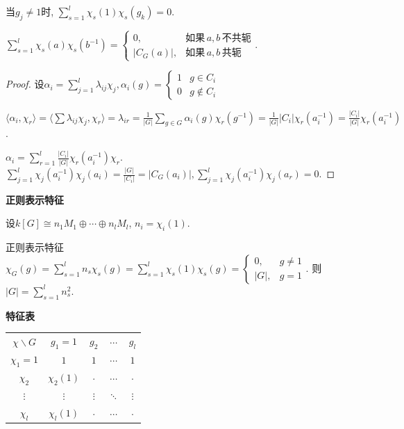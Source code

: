 \begin{corollary}
    当$g_j\neq 1$时, $\sum\limits_{s=1}^l \chi_s(1)\chi_s (g_k)=0$.\par
    \qquad $\sum\limits_{s=1}^l \chi_s(a)\chi_s(b^{-1})
    =\begin{cases} 0, &如果\,a,b\,不共轭\\ |C_G(a)|, &如果\,a, b\,共轭\end{cases}$.
\end{corollary}
\begin{proof}
	设$\alpha_i=\sum_{j=1}^{l} \lambda_{ij}\chi_j,\alpha_i(g)=\begin{cases} 1 &g\in C_i \\ 0 &g\notin C_i\end{cases}$
	
	$\langle  \alpha_i,\chi_r\rangle=\langle  \sum \lambda_{ij}\chi_j,\chi_r\rangle=\lambda _{ir}=\frac{1}{|G|}\sum_{g\in G}\alpha_i(g)\chi_r(g^{-1})=\frac{1}{|G|}|C_i|\chi_r(a_i^{-1})=\frac{|C_i|}{|G|}\chi_r(a_i^{-1})$.
	
	$\alpha_i=\sum_{r=1}^{l} \frac{|C_i|}{|G|}\chi_r(a_i^{-1})\chi_r.$
	$\sum_{j=1}^{l}\chi_j(a_i^{-1})\chi_j(a_i)=\frac{|G|}{|C_i|}=|C_G(a_i)|,\sum_{j=1}^{l}\chi_j(a_i^{-1})\chi_j(a_r)=0$.
\end{proof}
\begin{definition} \textbf{正则表示特征}\par
    \qquad 设$k[G]\cong n_1M_1\oplus \cdots \oplus n_lM_l$, $n_i=\chi_i(1)$.\par
    \qquad 正则表示特征$\chi_G(g)=\sum\limits_{s=1}^l n_s\chi_s(g)
    =\sum\limits_{s=1}^l \chi_s(1)\chi_s(g)
    =\begin{cases} 0, &g\neq 1\\ |G|, &g=1 \end{cases}$. 
    则$|G|=\sum\limits_{s=1}^l n_s^2$.

\end{definition}

\begin{definition}\textbf{特征表}
\begin{center}
\begin{tabular}{c|c|c|c|c} 
    $\chi \backslash G$ & $g_1=1$ & $g_2$ & $\cdots$ & $g_l$ \\
    $\chi_1=1$ & $1$ & $1$ & $\cdots$ & $1$\\
    $\chi_2$ & $\chi_2(1)$ & $\cdot$ & $\cdots$ & $\cdot$ \\
    $\vdots$ & $\vdots$ & $\vdots$ & $\ddots$ & $\vdots$ \\
    $\chi_l$ & $\chi_l(1)$ & $\cdot$  & $\cdots$ & $\cdot$
\end{tabular}
\end{center}
\end{definition}

